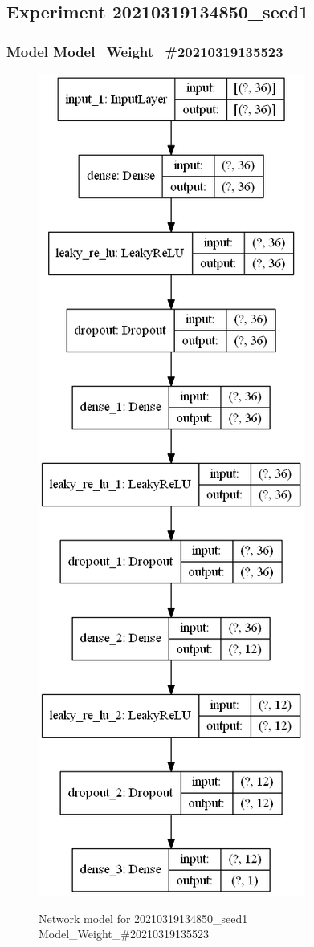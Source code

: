 \subsection{Experiment 20210319134850\_seed1}
\subsubsection{Model Model\_Weight\_\#20210319135523}

        \begin{figure}
        \caption{Network model for 20210319134850\_seed1 Model\_Weight\_\#20210319135523}
        \centering
            \includegraphics[width=0.5\linewidth]{20210319134850_seed1/ModelWeight20210319135523/model_struct.png}
        \label{fig:20210319134850seed1/ModelWeight20210319135523/modelstruct.png}
        \end{figure}
